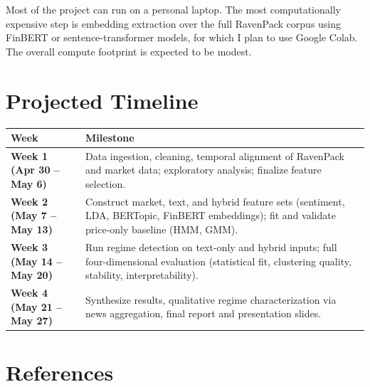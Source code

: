 \documentclass[12pt, letterpaper]{article}
\begin{document}
Most of the project can run on a personal laptop. The most computationally expensive step is embedding extraction over the full RavenPack corpus using FinBERT or sentence-transformer models, for which I plan to use Google Colab. The overall compute footprint is expected to be modest.

\section{Projected Timeline}

\begin{center}
\begin{tabular}{>{\bfseries}p{6cm} p{11cm}}
\toprule
Week & Milestone \\
\midrule
Week 1 (Apr 30 -- May 6)  & Data ingestion, cleaning, temporal alignment of RavenPack and market data; exploratory analysis; finalize feature selection. \\
Week 2 (May 7 -- May 13)  & Construct market, text, and hybrid feature sets (sentiment, LDA, BERTopic, FinBERT embeddings); fit and validate price-only baseline (HMM, GMM). \\
Week 3 (May 14 -- May 20) & Run regime detection on text-only and hybrid inputs; full four-dimensional evaluation (statistical fit, clustering quality, stability, interpretability). \\
Week 4 (May 21 -- May 27) & Synthesize results, qualitative regime characterization via news aggregation, final report and presentation slides. \\
\bottomrule
\end{tabular}
\end{center}




\bigskip

\section*{References}
\end{document}
